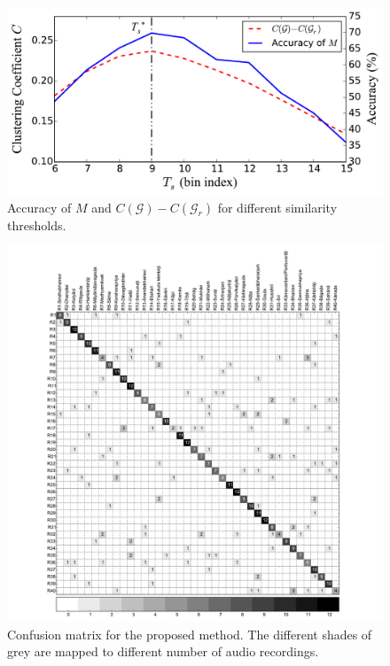 \begin{figure}
	\begin{center}
		\includegraphics[width=\figSizeEighty]{ch07_ragaRecognition/figures/accuracy_Vs_thresold.pdf}
	\end{center}
	\caption{Accuracy of $M$ and $C(\mathcal{G})-C(\mathcal{G}_r)$ for different similarity thresholds.}
	\label{fig:performance_across_thresholds}
\end{figure}

\begin{figure}
	\begin{center}
		\includegraphics[width=\figSizeHundred]{ch07_ragaRecognition/figures/cnf_mtx_40raga_with_annotation.pdf}
	\end{center}
	\caption{Confusion matrix for the proposed method. The different shades of grey are mapped to different number of audio recordings.}
	\label{fig:confusion_matrix}
\end{figure}

